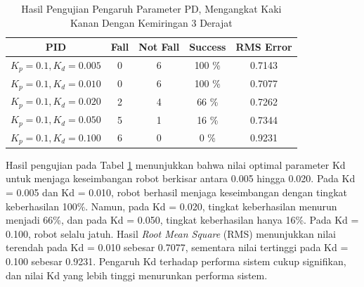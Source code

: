 \begin{enumerate}[label=\Alph*.]
        \begin{table}[h]
            \centering
            \caption{Hasil Pengujian Pengaruh Parameter PD, Mengangkat Kaki Kanan Dengan Kemiringan 3 Derajat}
            \begin{tabular}{|c|c|c|c|c|}
                \hline
                \textbf{PID} & \textbf{Fall} & \textbf{Not Fall} & \textbf{Success} & RMS Error \\
                \hline
                $K_p = 0.1, K_d = 0.005$ & 0 & 6 & 100 \% & 0.7143 \\
                $K_p = 0.1, K_d = 0.010$ & 0 & 6 & 100 \% & 0.7077 \\
                $K_p = 0.1, K_d = 0.020$ & 2 & 4 & 66  \% & 0.7262 \\
                $K_p = 0.1, K_d = 0.050$ & 5 & 1 & 16  \% & 0.7344 \\
                $K_p = 0.1, K_d = 0.100$ & 6 & 0 & 0   \% & 0.9231 \\          
                \hline
            \end{tabular}
            \label{tab:pengujian_pd}
        \end{table}

        \hspace*{1em} Hasil pengujian pada Tabel \ref{tab:pengujian_pd} menunjukkan bahwa nilai optimal parameter Kd untuk menjaga keseimbangan robot berkisar antara 0.005 hingga 0.020. Pada Kd = 0.005 dan Kd = 0.010, robot berhasil menjaga keseimbangan dengan tingkat keberhasilan 100\%. Namun, pada Kd = 0.020, tingkat keberhasilan menurun menjadi 66\%, dan pada Kd = 0.050, tingkat keberhasilan hanya 16\%. Pada Kd = 0.100, robot selalu jatuh. Hasil \textit{Root Mean Square} (RMS) menunjukkan nilai terendah pada Kd = 0.010 sebesar 0.7077, sementara nilai tertinggi pada Kd = 0.100 sebesar 0.9231. Pengaruh Kd terhadap performa sistem cukup signifikan, dan nilai Kd yang lebih tinggi menurunkan performa sistem.

\end{enumerate}